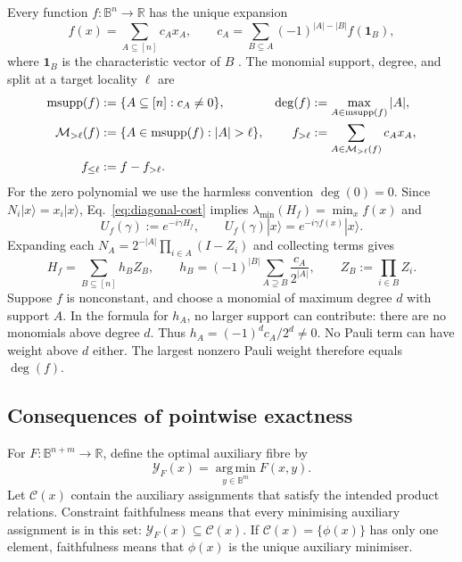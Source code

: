 \documentclass[a4paper,onecolumn,11pt,unpublished]{quantumarticle}
\theoremstyle{remark}
\begin{document}
Every function $f:\mathbb B^n\to\mathbb R$ has the unique expansion
\begin{equation}
  f(x)=\sum_{A\subseteq[n]}c_Ax_A,
  \qquad
  c_A=\sum_{B\subseteq A}(-1)^{|A|-|B|}f(\mathbf1_B),
  \label{eq:canonical-pb}
\end{equation}
where $\mathbf1_B$ is the characteristic vector of $B$
\cite{BorosHammer2002,Hadfield2021}.
The monomial support, degree, and split at a target locality $\ell$ are
\begin{align}
  \operatorname{msupp}(f)&:=\{A\subseteq[n]:c_A\ne0\},
  &\deg(f)&:=\max_{A\in\operatorname{msupp}(f)}|A|,
  \label{eq:support-degree}\\
  \mathcal M_{>\ell}(f)&:=\{A\in\operatorname{msupp}(f):|A|>\ell\},
  &f_{>\ell}&:=\sum_{A\in\mathcal M_{>\ell}(f)}c_Ax_A,
  \label{eq:target-split}\\
  f_{\leq\ell}&:=f-f_{>\ell}.\notag
\end{align}
For the zero polynomial we use the harmless convention $\deg(0)=0$.
Since $N_i|x\rangle=x_i|x\rangle$, Eq.~\eqref{eq:diagonal-cost}
implies $\lambda_{\min}(H_f)=\min_x f(x)$ and
\begin{equation}
  U_f(\gamma):=e^{-i\gamma H_f},
  \qquad U_f(\gamma)|x\rangle=e^{-i\gamma f(x)}|x\rangle.
  \label{eq:phase-separator}
\end{equation}
Expanding each $N_A=2^{-|A|}\prod_{i\in A}(I-Z_i)$ and collecting terms
gives~\cite{Hadfield2021}
\begin{equation}
  H_f=\sum_{B\subseteq[n]}h_BZ_B,
  \qquad
  h_B=(-1)^{|B|}\sum_{A\supseteq B}\frac{c_A}{2^{|A|}},
  \qquad Z_B:=\prod_{i\in B}Z_i.
  \label{eq:pauli-coefficients}
\end{equation}
Suppose $f$ is nonconstant, and choose a monomial of maximum degree $d$
with support $A$. In the formula for $h_A$, no larger support can contribute:
there are no monomials above degree $d$. Thus
$h_A=(-1)^dc_A/2^d\ne0$. No Pauli term can have weight above $d$ either.
The largest nonzero Pauli weight therefore equals $\deg(f)$.

\subsection{Consequences of pointwise exactness}

For $F:\mathbb B^{n+m}\to\mathbb R$, define the optimal auxiliary fibre by
\begin{equation}
\mathcal Y_F(x)=\operatorname*{arg\,min}_{y\in\mathbb B^m}F(x,y).
\label{eq:optimal-fibre}
\end{equation}
Let $\mathcal C(x)$ contain the auxiliary assignments that satisfy the
intended product relations. Constraint faithfulness means that every
minimising auxiliary assignment is in this set:
$\mathcal Y_F(x)\subseteq\mathcal C(x)$.
If $\mathcal C(x)=\{\phi(x)\}$ has only one element, faithfulness means
that $\phi(x)$ is the unique auxiliary minimiser.
\end{document}
